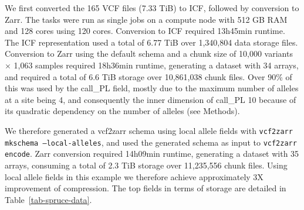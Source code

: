 \documentclass[a4paper,num-refs]{oup-contemporary}
\begin{document}
We first converted the 165 VCF files (7.33 TiB) to ICF, followed by
conversion to Zarr. The tasks were run as single jobs on a compute
node with 512 GB RAM and 128 cores using 120 cores. Conversion to ICF
required 13h45min runtime. The ICF representation used a total of 6.77
TiB over 1,340,804 data storage files. Conversion to Zarr 
using the default schema and a chunk size of 10,000 variants
$\times$ 1,063 samples
required 18h36min runtime, generating a dataset with 34 arrays, 
and required a total of 6.6 TiB storage over 10,861,038 chunk files. 
Over 90\% of this was used by the call\_PL field, mostly due to 
the maximum number of alleles at a site being 4,
and consequently the inner dimension of call\_PL 10 because 
of its quadratic dependency on the number of alleles (see Methods).

We therefore generated a vcf2zarr schema
using local allele fields with \texttt{vcf2zarr
mkschema --local-alleles}, and used the generated schema as input to
\texttt{vcf2zarr encode}. Zarr conversion required 14h09min runtime,
generating a dataset with 35 arrays, consuming a total of 2.3 TiB
storage over 11,235,556 chunk files. 
Using local allele fields in this example we therefore 
achieve approximately 3X improvement of compression. 
The top fields in terms of storage are
detailed in Table~\ref{tab-spruce-data}.
\end{document}
